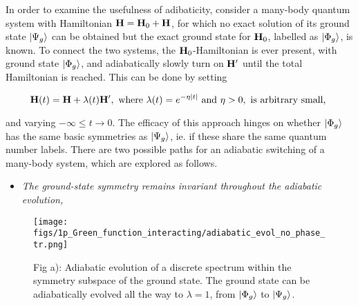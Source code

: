 In order to examine the usefulness of adibaticity, consider a many-body quantum system with Hamiltonian ${\bf H} = {\bf H}_0 + {\bf H}$, for which no exact solution of its ground state $\ket{\Psi_g}$ can be obtained but the exact ground state for ${\bf H}_0$, labelled as $\ket{\Phi_g}$, is known. To connect the two systems, the ${\bf H}_0$-Hamiltonian is ever present, with ground state $\ket{\Phi_g}$, and adiabatically slowly turn on ${\bf H}'$ until the total Hamiltonian is reached. This can be done by setting 

\begin{equation}
    {\bf H}(t) = {\bf H} + \lambda(t) {\bf H}', \textnormal{ where } \lambda(t) = e^{-\eta |t|} \textnormal{ and } \eta > 0, \textnormal{ is arbitrary small, }
    \label{Adiabatic_switching_on}
\end{equation}

\iffalse
\begin{figure}[H]
    \centering
    \subfloat[\centering ]{{\texttt{[image: figs/1p\_Green\_function\_interacting/adiabatic\_evol\_no\_phase\_tr.png]} }}
    \qquad
    \subfloat[\centering ]{{\texttt{[image: figs/1p\_Green\_function\_interacting/adiabatic\_evol\_phase\_tr.png]}}}
    \caption{\small  Fig a): Adiabatic evolution of a discrete spectrum within the symmetry subspace of the ground state. The ground state can be adiabatically evolved all the way to $\lambda = 1$, from $\ket{\Phi_g}$ to $\ket{\Psi_g}$. Fig b): Adiabatic evolution of the Hilbert space with $\lambda$. A phase transition occurs at $\lambda = \lambda_c$, where an excited state of the unperturbed Hamiltonian, with a symmetry different from that of the ground state, crosses below the ground state. } 
    \label{figs:adiabatic_evols}
\end{figure}
\fi

and varying $-\infty \leq t \rightarrow 0$. The efficacy of this approach hinges on whether $\ket{\Phi_g}$ has the same basic symmetries as $\ket{\Psi_g}$, ie. if these share the same quantum number labels. There are two possible paths for an adiabatic switching of a many-body system, which are explored as follows. \medbreak

\begin{itemize}
    \item \textit{The ground-state symmetry remains invariant throughout the adiabatic evolution, } 
\end{itemize}

    \begin{wrapfigure}{l}{0.3\textwidth}
        \texttt{[image: figs/1p\_Green\_function\_interacting/adiabatic\_evol\_no\_phase\_tr.png]}
        \caption{\small  Fig a): Adiabatic evolution of a discrete spectrum within the symmetry subspace of the ground state. The ground state can be adiabatically evolved all the way to $\lambda = 1$, from $\ket{\Phi_g}$ to $\ket{\Psi_g}$.}
        \label{figs:adiabatic_evols_a}
    \end{wrapfigure} 
    
